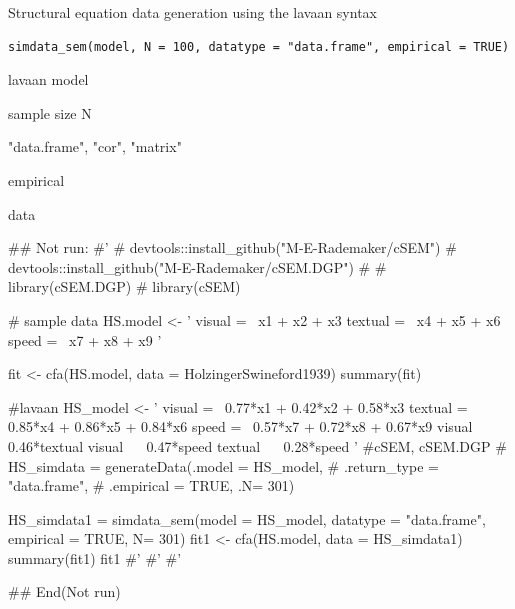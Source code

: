 \documentclass[a4paper]{book}
\begin{document}
%
\begin{Description}
Structural equation data generation using the lavaan syntax
\end{Description}
%
\begin{Usage}
\begin{verbatim}
simdata_sem(model, N = 100, datatype = "data.frame", empirical = TRUE)
\end{verbatim}
\end{Usage}
%
\begin{Arguments}
\begin{ldescription}
\item[\code{model}] lavaan model

\item[\code{N}] sample size N

\item[\code{datatype}] "data.frame", "cor", "matrix"

\item[\code{empirical}] empirical
\end{ldescription}
\end{Arguments}
%
\begin{Value}
data
\end{Value}
%
\begin{Examples}
\begin{ExampleCode}

\#\# Not run: 
#'
# devtools::install_github("M-E-Rademaker/cSEM")
# devtools::install_github("M-E-Rademaker/cSEM.DGP")
\#
# library(cSEM.DGP)
# library(cSEM)

# sample data
HS.model <- ' visual  =~ x1 + x2 + x3
              textual =~ x4 + x5 + x6
              speed   =~ x7 + x8 + x9
              '

fit <- cfa(HS.model, data = HolzingerSwineford1939)
summary(fit)

#lavaan
HS_model <- ' visual  =~ 0.77*x1 + 0.42*x2 + 0.58*x3
              textual =~ 0.85*x4 + 0.86*x5 + 0.84*x6
              speed   =~ 0.57*x7 + 0.72*x8 + 0.67*x9
              visual ~~  0.46*textual
              visual ~~  0.47*speed
              textual ~~  0.28*speed
          '
#cSEM, cSEM.DGP
# HS_simdata = generateData(.model = HS_model,
#                           .return_type = "data.frame",
#                           .empirical = TRUE, .N= 301)

HS_simdata1 = simdata_sem(model = HS_model,
                          datatype = "data.frame",
                          empirical = TRUE, N= 301)
fit1 <- cfa(HS.model, data = HS_simdata1)
summary(fit1)
fit1 %
#'
#'
#'


## End(Not run)
\end{ExampleCode}
\end{Examples}
\end{document}

